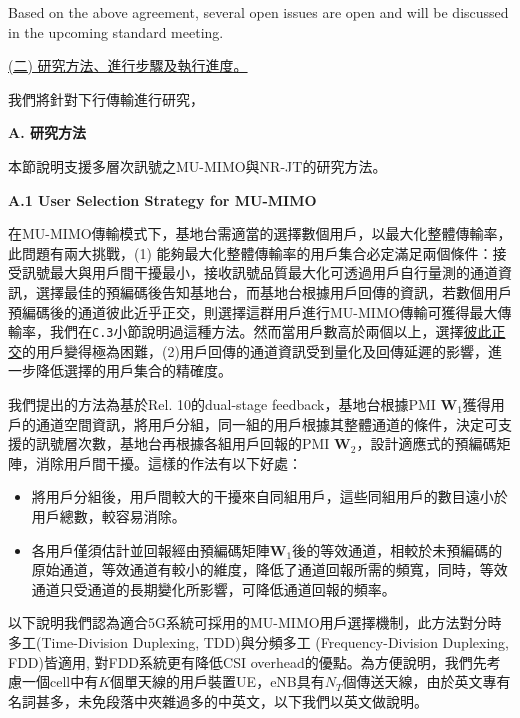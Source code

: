\documentclass[a4paper,12pt]{article}%
\begin{document}
Based on the above agreement, several open issues are open and will be discussed in the upcoming standard meeting. 




\noindent \underline{(二)	研究方法、進行步驟及執行進度。} 

我們將針對下行傳輸進行研究，

\noindent \textbf{A. 研究方法}

本節說明支援多層次訊號之MU-MIMO與NR-JT的研究方法。


\noindent \textbf{A.1 User Selection Strategy for MU-MIMO}

在MU-MIMO傳輸模式下，基地台需適當的選擇數個用戶，以最大化整體傳輸率，此問題有兩大挑戰，(1) 能夠最大化整體傳輸率的用戶集合必定滿足兩個條件：接受訊號最大與用戶間干擾最小，接收訊號品質最大化可透過用戶自行量測的通道資訊，選擇最佳的預編碼後告知基地台，而基地台根據用戶回傳的資訊，若數個用戶預編碼後的通道彼此近乎正交，則選擇這群用戶進行MU-MIMO傳輸可獲得最大傳輸率，我們在\texttt{C.3}小節說明過這種方法。然而當用戶數高於兩個以上，選擇\underline{彼此正交}的用戶變得極為困難，(2)用戶回傳的通道資訊受到量化及回傳延遲的影響，進一步降低選擇的用戶集合的精確度。

我們提出的方法為基於Rel. 10的dual-stage feedback，基地台根據PMI $\mathbf{W}_1$獲得用戶的通道空間資訊，將用戶分組，同一組的用戶根據其整體通道的條件，決定可支援的訊號層次數，基地台再根據各組用戶回報的PMI $\mathbf{W}_2$，設計適應式的預編碼矩陣，消除用戶間干擾。這樣的作法有以下好處：
\begin{itemize}
\item 將用戶分組後，用戶間較大的干擾來自同組用戶，這些同組用戶的數目遠小於用戶總數，較容易消除。
\item 各用戶僅須估計並回報經由預編碼矩陣$\mathbf{W}_1$後的等效通道，相較於未預編碼的原始通道，等效通道有較小的維度，降低了通道回報所需的頻寬，同時，等效通道只受通道的長期變化所影響，可降低通道回報的頻率。
\end{itemize}

以下說明我們認為適合5G系統可採用的MU-MIMO用戶選擇機制，此方法對分時多工(Time-Division Duplexing, TDD)與分頻多工 (Frequency-Division Duplexing, FDD)皆適用, 對FDD系統更有降低CSI overhead的優點。為方便說明，我們先考慮一個cell中有$K$個單天線的用戶裝置UE，eNB具有$N_T$個傳送天線，由於英文專有名詞甚多，未免段落中夾雜過多的中英文，以下我們以英文做說明。
\end{document}
